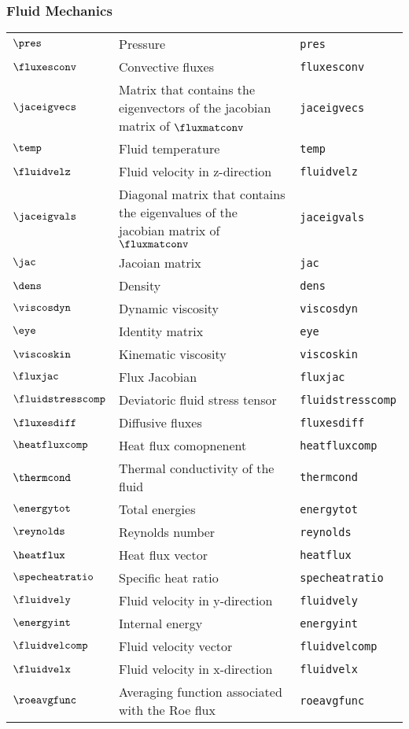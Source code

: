 \subsubsection*{Fluid Mechanics}
\begin{tabular}{l l l}
$\pres$ & Pressure& \texttt{pres}\\
$\fluxesconv$ & Convective fluxes& \texttt{fluxesconv}\\
$\jaceigvecs$ & Matrix that contains the eigenvectors of the jacobian matrix of $\fluxmatconv$& \texttt{jaceigvecs}\\
$\temp$ & Fluid temperature& \texttt{temp}\\
$\fluidvelz$ & Fluid velocity in z-direction& \texttt{fluidvelz}\\
$\jaceigvals$ & Diagonal matrix that contains the eigenvalues of the jacobian matrix of $\fluxmatconv$& \texttt{jaceigvals}\\
$\jac$ & Jacoian matrix& \texttt{jac}\\
$\dens$ & Density& \texttt{dens}\\
$\viscosdyn$ & Dynamic viscosity& \texttt{viscosdyn}\\
$\eye$ & Identity matrix& \texttt{eye}\\
$\viscoskin$ & Kinematic viscosity& \texttt{viscoskin}\\
$\fluxjac$ & Flux Jacobian& \texttt{fluxjac}\\
$\fluidstresscomp$ & Deviatoric fluid stress tensor& \texttt{fluidstresscomp}\\
$\fluxesdiff$ & Diffusive fluxes& \texttt{fluxesdiff}\\
$\heatfluxcomp$ & Heat flux comopnenent& \texttt{heatfluxcomp}\\
$\thermcond$ & Thermal conductivity of the fluid& \texttt{thermcond}\\
$\energytot$ & Total energies& \texttt{energytot}\\
$\reynolds$ & Reynolds number& \texttt{reynolds}\\
$\heatflux$ & Heat flux vector& \texttt{heatflux}\\
$\specheatratio$ & Specific heat ratio& \texttt{specheatratio}\\
$\fluidvely$ & Fluid velocity in y-direction& \texttt{fluidvely}\\
$\energyint$ & Internal energy& \texttt{energyint}\\
$\fluidvelcomp$ & Fluid velocity vector& \texttt{fluidvelcomp}\\
$\fluidvelx$ & Fluid velocity in x-direction& \texttt{fluidvelx}\\
$\roeavgfunc$ & Averaging function associated with the Roe flux& \texttt{roeavgfunc}\\
\end{tabular}


